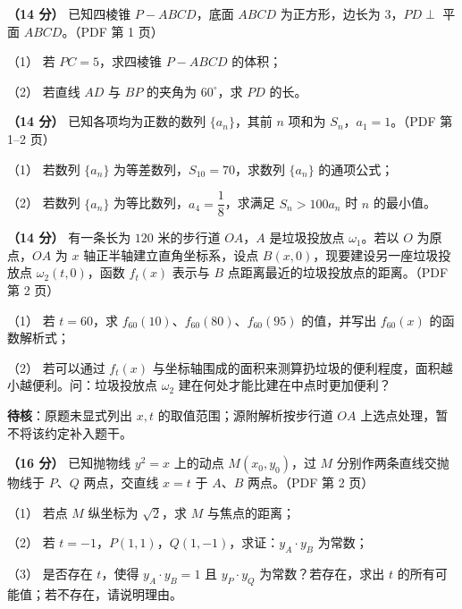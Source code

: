 \Needspace{0.4\textheight}
\begin{question}
\textbf{（14 分）} 已知四棱锥 $P-ABCD$，底面 $ABCD$ 为正方形，边长为 $3$，$PD\perp$ 平面 $ABCD$。（PDF 第 1 页）

（1） 若 $PC=5$，求四棱锥 $P-ABCD$ 的体积；

（2） 若直线 $AD$ 与 $BP$ 的夹角为 $60^\circ$，求 $PD$ 的长。
\nopagebreak[4]
\begin{center}\end{center}
\nopagebreak[4]
\end{question}
\begin{question}
\textbf{（14 分）} 已知各项均为正数的数列 $\{a_n\}$，其前 $n$ 项和为 $S_n$，$a_1=1$。（PDF 第 1–2 页）

（1） 若数列 $\{a_n\}$ 为等差数列，$S_{10}=70$，求数列 $\{a_n\}$ 的通项公式；

（2） 若数列 $\{a_n\}$ 为等比数列，$a_4=\dfrac18$，求满足 $S_n>100a_n$ 时 $n$ 的最小值。

\end{question}
\begin{question}
\textbf{（14 分）} 有一条长为 $120$ 米的步行道 $OA$，$A$ 是垃圾投放点 $\omega_1$。若以 $O$ 为原点，$OA$ 为 $x$ 轴正半轴建立直角坐标系，设点 $B(x,0)$，现要建设另一座垃圾投放点 $\omega_2(t,0)$，函数 $f_t(x)$ 表示与 $B$ 点距离最近的垃圾投放点的距离。（PDF 第 2 页）

（1） 若 $t=60$，求 $f_{60}(10)$、$f_{60}(80)$、$f_{60}(95)$ 的值，并写出 $f_{60}(x)$ 的函数解析式；

（2） 若可以通过 $f_t(x)$ 与坐标轴围成的面积来测算扔垃圾的便利程度，面积越小越便利。问：垃圾投放点 $\omega_2$ 建在何处才能比建在中点时更加便利？

\begin{gktip}
\textbf{待核}：原题未显式列出 $x,t$ 的取值范围；源附解析按步行道 $OA$ 上选点处理，暂不将该约定补入题干。
\end{gktip}

\end{question}
\begin{question}
\textbf{（16 分）} 已知抛物线 $y^2=x$ 上的动点 $M(x_0,y_0)$，过 $M$ 分别作两条直线交抛物线于 $P$、$Q$ 两点，交直线 $x=t$ 于 $A$、$B$ 两点。（PDF 第 2 页）

（1） 若点 $M$ 纵坐标为 $\sqrt2$，求 $M$ 与焦点的距离；

（2） 若 $t=-1$，$P(1,1)$，$Q(1,-1)$，求证：$y_A\cdot y_B$ 为常数；

（3） 是否存在 $t$，使得 $y_A\cdot y_B=1$ 且 $y_P\cdot y_Q$ 为常数？若存在，求出 $t$ 的所有可能值；若不存在，请说明理由。

\end{question}

